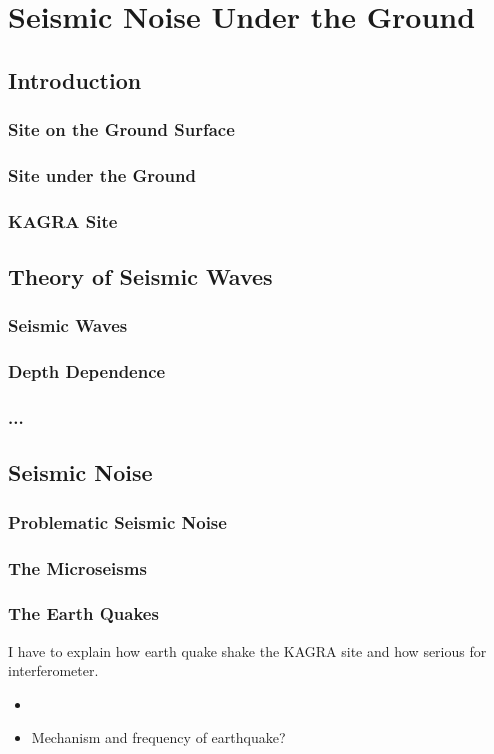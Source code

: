 \chapter{Seismic Noise Under the Ground}
\section{Introduction}
\subsection{Site on the Ground Surface}
\subsection{Site under the Ground}
\subsection{KAGRA Site}
\section{Theory of Seismic Waves}
\subsection{Seismic Waves}
\subsection{Depth Dependence}
\subsection{...}
\section{Seismic Noise}
\subsection{Problematic Seismic Noise}
\subsection{The Microseisms}

\subsection{The Earth Quakes}
I have to explain how earth quake shake the KAGRA site and how serious for interferometer.
\begin{itemize}
\item 
\item Mechanism and frequency of earthquake?
\end{itemize}

